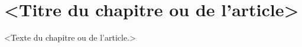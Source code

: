 \chapter{<Titre du chapitre ou de l'article>}     %
\label{chap-}                   %

<Texte du chapitre ou de l'article.>
